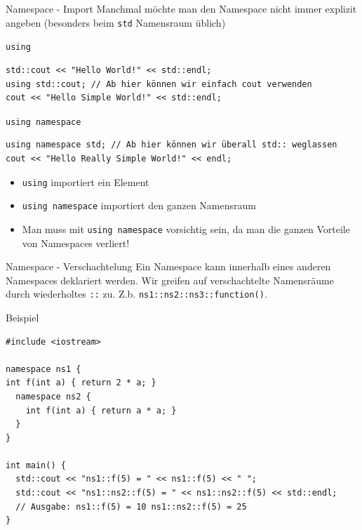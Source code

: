 \documentclass[presentation]{beamer}
\begin{document}
\begin{frame}[fragile,label={sec:org6eb249e}]{Namespace - Import}
 Manchmal möchte man den Namespace nicht immer explizit angeben
(besonders beim {\color{solarizedYellow}\texttt{std} }Namensraum üblich)
\begin{block}{{\color{solarizedYellow}\texttt{using}}}
\begin{verbatim}
std::cout << "Hello World!" << std::endl;
using std::cout; // Ab hier können wir einfach cout verwenden
cout << "Hello Simple World!" << std::endl;
\end{verbatim}
\end{block}
\begin{block}{{\color{solarizedYellow}\texttt{using namespace}}}
\begin{verbatim}
using namespace std; // Ab hier können wir überall std:: weglassen
cout << "Hello Really Simple World!" << endl;
\end{verbatim}
\end{block}
\begin{itemize}
\item {\color{solarizedYellow}\texttt{using} }importiert ein Element
\item {\color{solarizedYellow}\texttt{using namespace} }importiert den ganzen Namensraum
\item Man muss mit {\color{solarizedYellow}\texttt{using namespace} }vorsichtig sein, da man die ganzen
Vorteile von Namespaces verliert!
\end{itemize}
\end{frame}
\begin{frame}[fragile,label={sec:orgbd64942}]{Namespace - Verschachtelung}
 Ein Namespace kann innerhalb eines anderen Namespaces deklariert
werden. Wir greifen auf verschachtelte Namensräume durch wiederholtes
{\color{solarizedYellow}\texttt{::} }zu. Z.b. {\color{solarizedYellow}\texttt{ns1::ns2::ns3::function()}}.
\begin{block}{Beispiel}
\begin{verbatim}
#include <iostream>

namespace ns1 {
int f(int a) { return 2 * a; }
  namespace ns2 {
    int f(int a) { return a * a; }
  }
}

int main() {
  std::cout << "ns1::f(5) = " << ns1::f(5) << " ";
  std::cout << "ns1::ns2::f(5) = " << ns1::ns2::f(5) << std::endl;
  // Ausgabe: ns1::f(5) = 10 ns1::ns2::f(5) = 25
}
\end{verbatim}
\end{block}
\end{frame}
\end{document}
